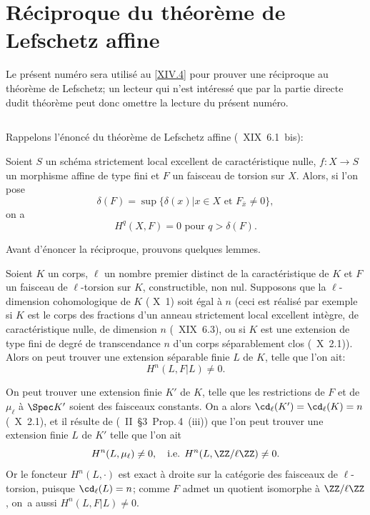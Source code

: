 \section{R\'eciproque du th\'eor\`eme de Lefschetz affine} \label{XIV.3}

Le pr\'esent num\'ero sera utilis\'e au \numero \ref{XIV.4} pour prouver une r\'eciproque au \og th\'eor\`eme de Lefschetz\fg; un lecteur qui n'est int\'eress\'e que par la partie directe dudit th\'eor\`eme peut donc omettre la lecture du pr\'esent num\'ero.

\subsection{} \label{XIV.3.1}

Rappelons l'\'enonc\'e du th\'eor\`eme de Lefschetz affine (~XIX~6.1~bis):

Soient $S$ un sch\'ema strictement local excellent de caract\'eristique nulle, $f:X\to S$ un morphisme affine de type fini et $F$ un faisceau de torsion sur $X$. Alors, si l'on pose
$$
\delta(F)=\sup\{\delta(x)|x\in X \text{ et } F_{\bar{x}} \neq 0\},
$$
on a
$$
H^q(X, F)=0 \text{ pour } q>\delta(F).
$$

Avant d'\'enoncer la r\'eciproque, prouvons quelques lemmes.

\begin{lemme} \label{XIV.3.2} Soient $K$ un corps, $\ell$ un nombre premier distinct de la caract\'eristique de $K$ et $F$ un faisceau de $\ell$-torsion sur $K$, constructible, non nul. Supposons que la $\ell$-dimension cohomologique de $K$ (\textup{ X~1}) soit \'egal \`a $n$ (ceci est r\'ealis\'e par exemple si $K$ est le corps des fractions d'un anneau strictement local excellent int\`egre, de caract\'eristique nulle, de dimension $n$ (\textup{~XIX~6.3}), ou si $K$ est une extension de type fini de degr\'e de transcendance $n$ d'un corps s\'eparablement clos (\textup{~X~2.1})). Alors on peut trouver une extension s\'eparable finie $L$ de $K$, telle que l'on ait:
$$H^n(L, F{|L}) \neq 0.
$$
\end{lemme}

On peut trouver une extension finie $K'$ de $K$, telle que les restrictions de $F$ et de $\mu_\ell$ \`a $\Spec K'$ soient des faisceaux constants. On a alors $\cd_{\ell}(K') = \cd_{\ell}(K) = n$ (~X~2.1), et il r\'esulte de (\cite{XIV.2}~II~\S 3~Prop.\,4~\textup{(iii)}) que l'on peut trouver une extension finie $L$ de $K'$ telle que l'on ait
$$
H^n(L, \mu_{\ell})\neq 0, \quad\text {i.e. } H^n(L, \ZZ/\ell\ZZ) \neq 0.
$$
Or le foncteur $H^n(L,\cdot)$ est exact \`a droite sur la cat\'egorie des faisceaux de $\ell$-torsion, puisque $\cd_{\ell}(L)=n$; comme $F$ admet un quotient isomorphe \`a $\ZZ/\ell\ZZ$, on~a aussi $H^n(L, F{|L}) \neq 0$.


